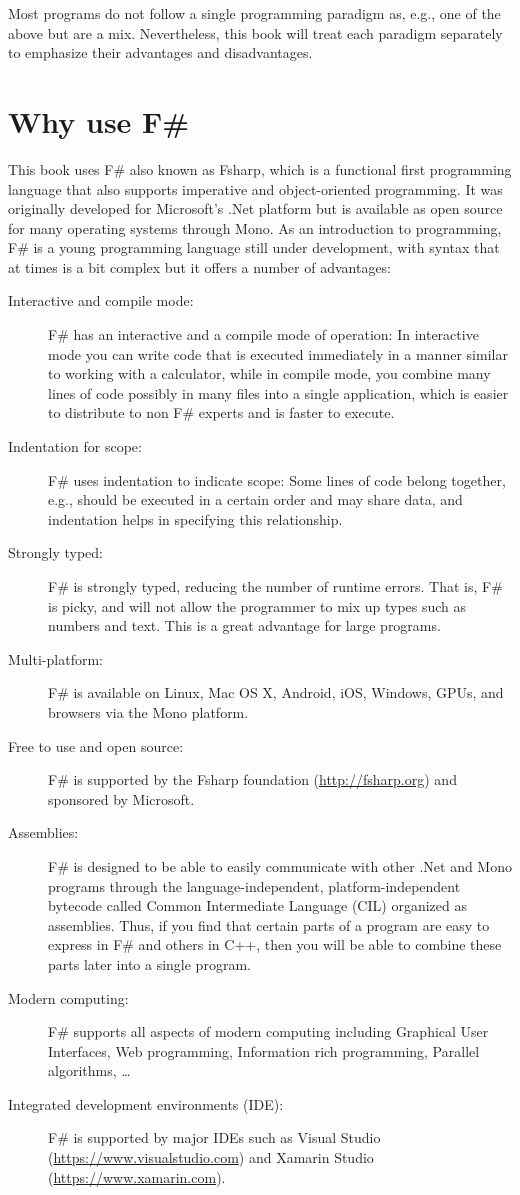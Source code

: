 Most programs do not follow a single programming paradigm as, e.g., one of the above but are a mix. Nevertheless, this book will treat each paradigm separately to emphasize their advantages and disadvantages.

\section{Why use F\#}
This book uses F\# also known as Fsharp, which is a functional first programming language that also supports imperative and object-oriented programming. It was originally developed for Microsoft's .Net platform but is available as open source for many operating systems through Mono. As an introduction to programming, F\# is a young programming language still under development, with syntax that at times is a bit complex but it offers a number of advantages:
\begin{description}
\item[Interactive and compile mode:] F\# has an interactive and a compile mode of operation: In interactive mode you can write code that is executed immediately in a manner similar to working with a calculator, while in compile mode, you combine many lines of code possibly in many files into a single application, which is easier to distribute to non F\# experts and is faster to execute.
\item[Indentation for scope:] F\# uses indentation to indicate scope: Some lines of code belong together, e.g., should be executed in a certain order and may share data, and indentation helps in specifying this relationship.
\item[Strongly typed:] F\# is strongly typed, reducing the number of runtime errors. That is, F\# is picky, and will not allow the programmer to mix up types such as numbers and text. This is a great advantage for large programs.
\item[Multi-platform:] F\# is available on Linux, Mac OS X, Android, iOS, Windows, GPUs, and browsers via the Mono platform.
\item[Free to use and open source:] F\# is supported by the Fsharp foundation (\url{http://fsharp.org}) and sponsored by Microsoft.
\item[Assemblies:] F\# is designed to be able to easily communicate with other .Net and Mono programs through the language-independent, platform-independent bytecode called Common Intermediate Language (CIL) organized as assemblies. Thus, if you find that certain parts of a program are easy to express in F\# and others in C++, then you will be able to combine these parts later into a single program.
\item[Modern computing:] F\# supports all aspects of modern computing including Graphical User Interfaces, Web programming, Information rich programming, Parallel algorithms, \dots
\item[Integrated development environments (IDE):] F\# is supported by major IDEs such as Visual Studio (\url{https://www.visualstudio.com}) and Xamarin Studio (\url{https://www.xamarin.com}).
\end{description}

